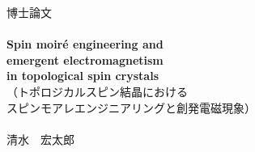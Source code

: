 \begin{titlepage}
\center
{\LARGE 博士論文}\\[1.5cm]
\HRule \\[0.6cm]
\fontsize{22pt}{24pt}\selectfont
{\bf
Spin moir\'e engineering and \\
emergent electromagnetism\\ 
in topological spin crystals
}
\\[0.6cm]
{\fontsize{16pt}{18pt}\selectfont
（トポロジカルスピン結晶における\\
スピンモアレエンジニアリングと創発電磁現象）
}
\\[0.3cm]
\HRule \\[10cm]

{\Large 清水　宏太郎}\\[0.5cm]
\vfill
\afterpage{\blankpage}
\end{titlepage}
